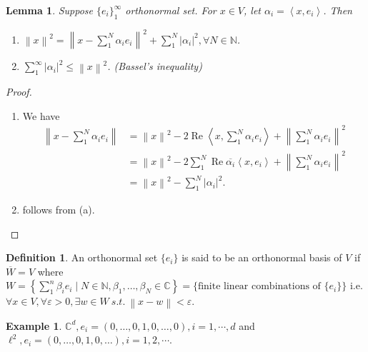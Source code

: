 \documentclass{report}
\newcommand{\C}{\mathbb{C}}
\newcommand{\N}{\mathbb{N}}
\newcommand{\st}{\ s.t.\ }
\def \re {\operatorname{Re}}
\newcommand{\inner}[2]{\left\langle #1, #2\right\rangle}
\newcommand{\norm}[1]{\left\| #1 \right\|}
\newtheorem{lemma}[theorem]{Lemma}
\theoremstyle{definition}
\newtheorem{definition}[theorem]{Definition}
\newtheorem{example}[theorem]{Example}
\theoremstyle{remark}
\begin{document}
\begin{lemma}
	Suppose $\{e_i\}_1^\infty$ orthonormal set. For $x \in V$, let $\alpha_i = \inner{x}{e_i}$. Then \begin{enumerate}
		\item $\norm{x}^2 = \norm{x - \sum_{1}^N \alpha_i e_i}^2 + \sum_{1}^N |\alpha_i|^2, \forall N \in \N$.
		\item $\sum_1^\infty |\alpha_i|^2 \leq \norm{x}^2$. (Bassel's inequality)
	\end{enumerate}
\end{lemma}
\begin{proof}
	\begin{enumerate}
		\item We have \begin{align*}
			\norm{x - \sum_1^N\alpha_i e_i} & = \norm{x}^2 - 2\re\inner{x}{\sum_1^N \alpha_i e_i} + \norm{\sum_1^N \alpha_i e_i}^2 \\
			& = \norm{x}^2 - 2\sum_1^N \re\overline{\alpha_i}\inner{x}{e_i} + \norm{\sum_1^N \alpha_i e_i}^2 \\
			& = \norm{x}^2 - \sum_1^N |\alpha_i|^2.
		\end{align*}
		\item follows from (a). \qedhere
	\end{enumerate}
\end{proof}

\begin{definition}
	An orthonormal set $\{e_i\}$ is said to be an orthonormal basis of $V$ if $\overline{W} = V$ where $W = \left\{\sum_1^n \beta_i e_i \mid N \in \N, \beta_1, \ldots, \beta_N \in \C \right\} = \{\text{finite linear combinations of $\{e_i\}$}\}$ i.e. $\forall x \in V, \forall \varepsilon > 0, \exists w \in W \st \norm{x - w} < \varepsilon$.
\end{definition}
\begin{example}
	$\C^d, e_i = (0, \ldots, 0, 1, 0, \ldots, 0), i = 1, \cdots, d$ and $\ell^2, e_i = (0, \ldots, 0, 1, 0, \ldots), i = 1, 2, \cdots$. 
\end{example}
\end{document}
